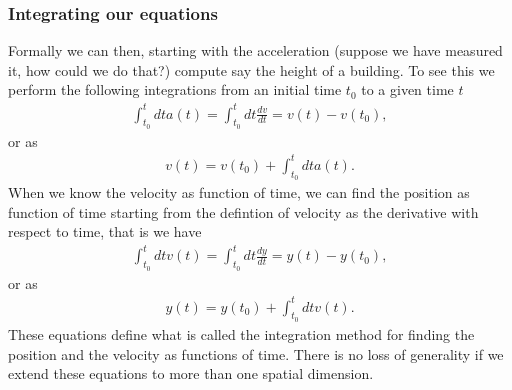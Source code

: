 \documentclass[letterpaper,10pt,english]{sphinxmanual}
\begin{document}
\subsubsection{Integrating our equations}
\label{\detokenize{chapter2:integrating-our-equations}}
Formally we can then, starting with the acceleration (suppose we have measured it, how could we do that?)
compute say the height of a building.  To see this we perform the following integrations from an initial time \(t_0\)  to a given time \(t\)
\begin{equation*}
\begin{split}
\int_{t_0}^t dt a(t) = \int_{t_0}^t dt \frac{dv}{dt} = v(t)-v(t_0),
\end{split}
\end{equation*}
or as
\begin{equation*}
\begin{split}
v(t)=v(t_0)+\int_{t_0}^t dt a(t).
\end{split}
\end{equation*}
When we know the velocity as function of time, we can find the position as function of time starting from the defintion of velocity as the derivative with respect to time, that is we have
\begin{equation*}
\begin{split}
\int_{t_0}^t dt v(t) = \int_{t_0}^t dt \frac{dy}{dt} = y(t)-y(t_0),
\end{split}
\end{equation*}
or as
\begin{equation*}
\begin{split}
y(t)=y(t_0)+\int_{t_0}^t dt v(t).
\end{split}
\end{equation*}
These equations define what is called the integration method for
finding the position and the velocity as functions of time. There is
no loss of generality if we extend these equations to more than one
spatial dimension.
\end{document}
